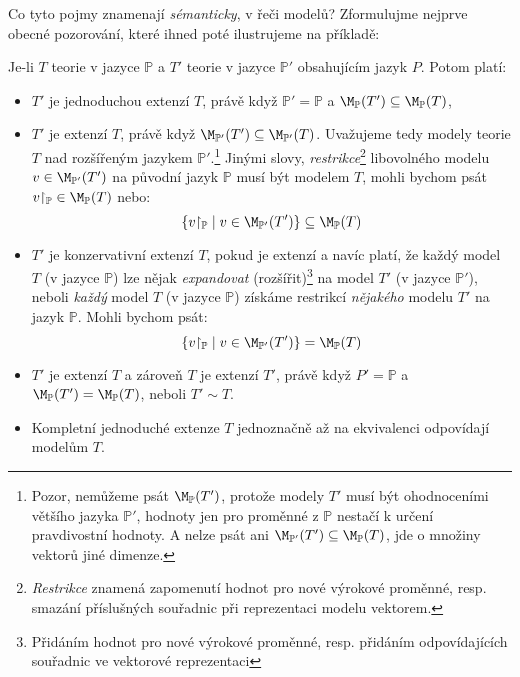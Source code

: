 Co tyto pojmy znamenají \emph{sémanticky}, v řeči modelů? Zformulujme nejprve obecné pozorování, které ihned poté ilustrujeme na příkladě:
\begin{observation}\label{observation:extensions-semantic-description-propositional}
    Je-li $T$ teorie v jazyce $\mathbb P$ a $T'$ teorie v jazyce $\mathbb P'$ obsahujícím jazyk $P$. Potom platí:
    \begin{itemize}
        \item $T'$ je jednoduchou extenzí $T$, právě když $\mathbb P'=\mathbb P$ a $\M_\mathbb P(T')\subseteq\M_\mathbb P(T)$,
        \item $T'$ je extenzí $T$, právě když $\M_{\mathbb P'}(T')\subseteq\M_{\mathbb P'}(T)$. Uvažujeme tedy modely teorie $T$ nad rozšířeným jazykem $\mathbb P'$.\footnote{Pozor, nemůžeme psát $\M_\mathbb P(T')$, protože modely $T'$ musí být ohodnoceními většího jazyka $\mathbb P'$, hodnoty jen pro proměnné z $\mathbb P$ nestačí k určení pravdivostní hodnoty. A nelze psát ani $\M_{\mathbb P'}(T')\subseteq\M_{\mathbb P}(T)$, jde o množiny vektorů jiné dimenze.} Jinými slovy, \emph{restrikce}\footnote{\emph{Restrikce} znamená zapomenutí hodnot pro nové výrokové proměnné, resp. smazání příslušných souřadnic při reprezentaci modelu vektorem.} libovolného modelu $v\in\M_{\mathbb P'}(T')$ na původní jazyk $\mathbb P$ musí být modelem $T$, mohli bychom psát $v{\restriction_\mathbb P}\in\M_\mathbb P(T)$ nebo:
        $$
        \{v{\restriction_\mathbb P}\mid v\in\M_{\mathbb P'}(T')\}\subseteq\M_\mathbb P(T)
        $$
        \item $T'$ je konzervativní extenzí $T$, pokud je extenzí a navíc platí, že každý model $T$ (v jazyce $\mathbb P$) lze nějak \emph{expandovat} (rozšířit)\footnote{Přidáním hodnot pro nové výrokové proměnné, resp. přidáním odpovídajících souřadnic ve vektorové reprezentaci} na model $T'$ (v jazyce $\mathbb P'$), neboli \emph{každý} model $T$ (v jazyce $\mathbb P$) získáme restrikcí \emph{nějakého} modelu $T'$ na jazyk $\mathbb P$. Mohli bychom psát:
        $$
        \{v{\restriction_\mathbb P}\mid v\in\M_      {\mathbb P'}(T')\}=\M_\mathbb P(T)
        $$
        \item $T'$ je extenzí $T$ a zároveň $T$ je extenzí $T'$, právě když $P'=\mathbb P$ a $\M_\mathbb P(T')=\M_\mathbb P(T)$, neboli $T'\sim T$.        
        \item Kompletní jednoduché extenze $T$ jednoznačně až na ekvivalenci odpovídají modelům $T$.
    \end{itemize}
\end{observation}

